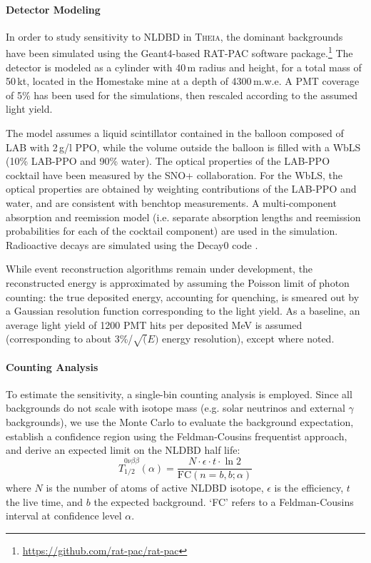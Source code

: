 \paragraph{Detector Modeling}
In order to study sensitivity to NLDBD in \textsc{Theia}, the dominant
backgrounds have been simulated using the Geant4-based RAT-PAC software
package.\footnote{\url{https://github.com/rat-pac/rat-pac}}
The detector is modeled as a cylinder with 40\,m radius and height, for a
total mass of 50\,kt, located in the Homestake mine at a depth of 4300\,m.w.e.
A PMT coverage of 5\% has been used for the simulations, then rescaled
according to the assumed light yield.

The model assumes a liquid scintillator contained in the balloon
composed of LAB with 2\,g/l PPO, while the volume outside the balloon is
filled with a WbLS (10\% LAB-PPO and 90\% water). The optical properties of
the LAB-PPO cocktail have been measured by the SNO+ collaboration. For the
WbLS, the optical properties are obtained by weighting contributions of the
LAB-PPO and water, and are consistent with benchtop measurements.
A multi-component absorption and reemission model (i.e. separate absorption
lengths and reemission probabilities for each of the cocktail component) are
used in the simulation. Radioactive decays are simulated using the Decay0
code \cite{decay0}.

While event reconstruction algorithms remain under development, the
reconstructed energy is approximated by assuming the Poisson limit of
photon counting: the true deposited energy, accounting for quenching, is
smeared out by a Gaussian resolution function corresponding to the light
yield. As a baseline, an average light yield of 1200 PMT hits per deposited
MeV is assumed (corresponding to about 3\%/$\sqrt(E)$ energy resolution), except where noted.

\paragraph{Counting Analysis}
To estimate the sensitivity, a single-bin counting analysis is employed. Since
all backgrounds do not scale with isotope mass (e.g. solar neutrinos
and external $\gamma$ backgrounds), we use the Monte Carlo to evaluate the
background expectation, establish a confidence region using the Feldman-Cousins
frequentist approach, and derive an expected limit on the NLDBD half life:
\begin{equation}
\label{eq:sens}
\widehat{T}_{1/2}^{0\nu\beta\beta}(\alpha) = 
\frac{N\cdot \epsilon \cdot t \cdot \ln 2}{\mathrm{FC}(n=b, b; \alpha)}
\end{equation}
where $N$ is the number of atoms of active NLDBD isotope, $\epsilon$ is the
efficiency, $t$ the live time, and $b$ the expected background.
`FC' refers to a Feldman-Cousins interval at confidence level
$\alpha$.

